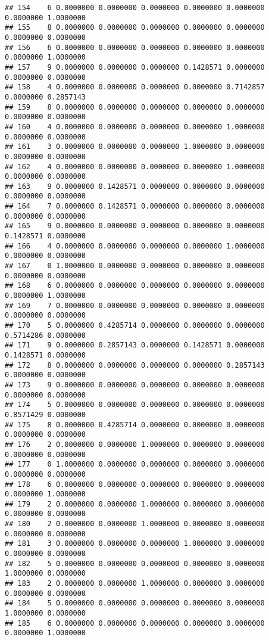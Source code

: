 \documentclass[
]{article}
\begin{document}
\begin{verbatim}
## 154    6 0.0000000 0.0000000 0.0000000 0.0000000 0.0000000 0.0000000 1.0000000
## 155    8 0.0000000 0.0000000 0.0000000 0.0000000 0.0000000 0.0000000 0.0000000
## 156    6 0.0000000 0.0000000 0.0000000 0.0000000 0.0000000 0.0000000 1.0000000
## 157    9 0.0000000 0.0000000 0.0000000 0.1428571 0.0000000 0.0000000 0.0000000
## 158    4 0.0000000 0.0000000 0.0000000 0.0000000 0.7142857 0.0000000 0.2857143
## 159    8 0.0000000 0.0000000 0.0000000 0.0000000 0.0000000 0.0000000 0.0000000
## 160    4 0.0000000 0.0000000 0.0000000 0.0000000 1.0000000 0.0000000 0.0000000
## 161    3 0.0000000 0.0000000 0.0000000 1.0000000 0.0000000 0.0000000 0.0000000
## 162    4 0.0000000 0.0000000 0.0000000 0.0000000 1.0000000 0.0000000 0.0000000
## 163    9 0.0000000 0.1428571 0.0000000 0.0000000 0.0000000 0.0000000 0.0000000
## 164    7 0.0000000 0.1428571 0.0000000 0.0000000 0.0000000 0.0000000 0.0000000
## 165    9 0.0000000 0.0000000 0.0000000 0.0000000 0.0000000 0.1428571 0.0000000
## 166    4 0.0000000 0.0000000 0.0000000 0.0000000 1.0000000 0.0000000 0.0000000
## 167    0 1.0000000 0.0000000 0.0000000 0.0000000 0.0000000 0.0000000 0.0000000
## 168    6 0.0000000 0.0000000 0.0000000 0.0000000 0.0000000 0.0000000 1.0000000
## 169    7 0.0000000 0.0000000 0.0000000 0.0000000 0.0000000 0.0000000 0.0000000
## 170    5 0.0000000 0.4285714 0.0000000 0.0000000 0.0000000 0.5714286 0.0000000
## 171    9 0.0000000 0.2857143 0.0000000 0.1428571 0.0000000 0.1428571 0.0000000
## 172    8 0.0000000 0.0000000 0.0000000 0.0000000 0.2857143 0.0000000 0.0000000
## 173    9 0.0000000 0.0000000 0.0000000 0.0000000 0.0000000 0.0000000 0.0000000
## 174    5 0.0000000 0.0000000 0.0000000 0.0000000 0.0000000 0.8571429 0.0000000
## 175    8 0.0000000 0.4285714 0.0000000 0.0000000 0.0000000 0.0000000 0.0000000
## 176    2 0.0000000 0.0000000 1.0000000 0.0000000 0.0000000 0.0000000 0.0000000
## 177    0 1.0000000 0.0000000 0.0000000 0.0000000 0.0000000 0.0000000 0.0000000
## 178    6 0.0000000 0.0000000 0.0000000 0.0000000 0.0000000 0.0000000 1.0000000
## 179    2 0.0000000 0.0000000 1.0000000 0.0000000 0.0000000 0.0000000 0.0000000
## 180    2 0.0000000 0.0000000 1.0000000 0.0000000 0.0000000 0.0000000 0.0000000
## 181    3 0.0000000 0.0000000 0.0000000 1.0000000 0.0000000 0.0000000 0.0000000
## 182    5 0.0000000 0.0000000 0.0000000 0.0000000 0.0000000 1.0000000 0.0000000
## 183    2 0.0000000 0.0000000 1.0000000 0.0000000 0.0000000 0.0000000 0.0000000
## 184    5 0.0000000 0.0000000 0.0000000 0.0000000 0.0000000 1.0000000 0.0000000
## 185    6 0.0000000 0.0000000 0.0000000 0.0000000 0.0000000 0.0000000 1.0000000

\end{verbatim}
\end{document}
